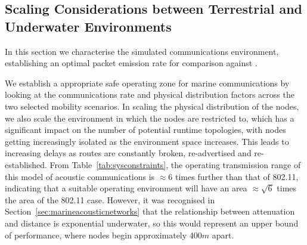 \documentclass[runningheads,a4paper]{llncs}
\begin{document}
\subsection{Scaling Considerations between Terrestrial and Underwater Environments}

In this section we characterise the simulated communications environment, establishing an optimal packet emission rate for comparison against \cite{Guo11}.

We establish a appropriate safe operating zone for marine communications by looking at the communications rate and physical distribution factors across the two selected mobility scenarios.
In scaling the physical distribution of the nodes, we also scale the environment in which the nodes are restricted to, which has a significant impact on the number of potential runtime topologies, with nodes getting increasingly isolated as the environment space increases.
This leads to increasing delays as routes are constantly broken, re-advertised and re-established. 
From Table~\ref{tab:sysconstraints}, the operating transmission range of this model of acoustic communications is $\approx 6$ times further than that of 802.11, indicating that a suitable operating environment will have an area $\approx \sqrt{6}$ times the area of the 802.11 case.
However, it was recognised in Section~\ref{sec:marineacousticnetworks} that the relationship between attenuation and distance is exponential underwater, so this would represent an upper bound of performance, where nodes begin approximately 400$m$ apart. 
\end{document}

